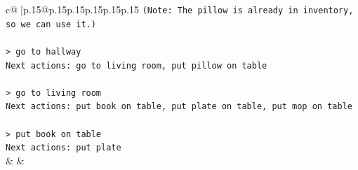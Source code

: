 \documentclass{article}
\begin{document}
{\begin{supertabular}{c@{$\;$}|p{.15\linewidth}@{}p{.15\linewidth}p{.15\linewidth}p{.15\linewidth}p{.15\linewidth}p{.15\linewidth}}
{{{\texttt{(Note: The pillow is already in inventory, so we can use it.)  } \\
\\ 
\texttt{> go to hallway  } \\
\texttt{Next actions: go to living room, put pillow on table  } \\
\\ 
\texttt{> go to living room  } \\
\texttt{Next actions: put book on table, put plate on table, put mop on table  } \\
\\ 
\texttt{> put book on table  } \\
\texttt{Next actions: put plate} \\
            }
        }
    }
    & & \\ \\


\end{supertabular}}
\end{document}
